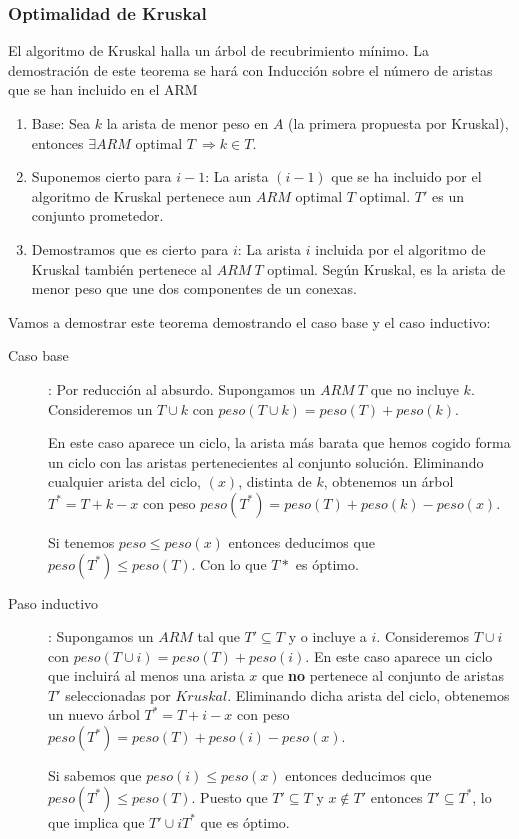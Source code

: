 \documentclass[10pt,a4paper,spanish]{report}
\theoremstyle{definition}
\theoremstyle{remark}
\begin{document}
\subsubsection{\textcolor{electriccrimson}Optimalidad de Kruskal}

El algoritmo de Kruskal halla un árbol de recubrimiento mínimo. La demostración de este teorema se hará con Inducción sobre el número de aristas que se han incluido en el ARM

\begin{enumerate}[---]
    \item Base: Sea $k$ la arista de menor peso en $A$ (la primera propuesta por Kruskal), entonces $\exists ARM$ optimal $T \ \Rightarrow {k} \in T$.

    \item Suponemos cierto para $i-1$: La arista $(i-1)$ que se ha incluido por el algoritmo de Kruskal pertenece aun $ARM$ optimal $T$ optimal. $T'$ es un conjunto prometedor.

    \item Demostramos que es cierto para $i$: La arista $i$ incluida por el algoritmo de Kruskal también pertenece al $ARM \ T$ optimal. Según Kruskal, es la arista de menor peso que une dos componentes de un conexas. 
\end{enumerate}

Vamos a demostrar este teorema demostrando el caso base y el caso inductivo:

\begin{description}
    \item[Caso base]: Por reducción al absurdo. Supongamos un $ARM \ T$ que no incluye $k$. Consideremos un $T\cup k$ con $peso(T\cup k) = peso(T)+peso(k)$.

    En este caso aparece un ciclo, la arista más barata que hemos cogido forma un ciclo con las aristas pertenecientes al conjunto solución. Eliminando cualquier arista del ciclo, $(x)$, distinta de $k$, obtenemos un árbol $T^*=T+k-x$ con peso $peso(T^*) = peso(T) + peso(k) - peso(x)$.

    Si tenemos $peso \leq peso(x)$ entonces deducimos que $peso(T^*) \leq peso(T)$. Con lo que $T*$ es óptimo.

    \item[Paso inductivo]: Supongamos un $ARM$ tal que $T'\subseteq T$ y o incluye a $i$. Consideremos $T \cup i$ con $peso(T\cup i) = peso(T) + peso(i)$. En este caso aparece un ciclo que incluirá al menos una arista $x$ que \textbf{no} pertenece al conjunto de aristas $T'$ seleccionadas por $Kruskal$. Eliminando dicha arista del ciclo, obtenemos un nuevo árbol $T^*=T+i-x$ con peso $peso(T^*) = peso(T) + peso(i) - peso(x)$.

    Si sabemos que $peso(i) \leq peso(x)$ entonces deducimos que $peso(T^*)\leq peso(T)$. Puesto que $T' \subseteq T$ y $x \not\in T'$ entonces $T'\subseteq T^*$, lo que implica que $T'\cup i T^*$ que es óptimo.
\end{description}
\end{document}
